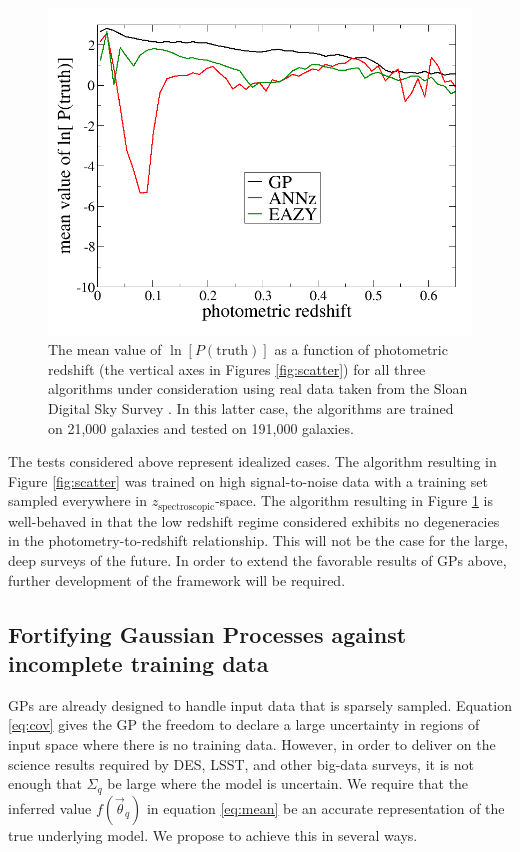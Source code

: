 \documentclass[prd,nofootbib,floatfix,11pt,tightenlines]{revtex4}
\begin{document}
\begin{figure}[th]
\centerline{\includegraphics[scale=0.3]{sdss_lnsum.png}}
\caption{
The mean value of
$\ln[P(\text{truth})]$ as a function of photometric redshift (the vertical
axes in Figures \ref{fig:scatter}) for all
three algorithms under consideration using real
data taken from the Sloan Digital Sky Survey \cite{Abazajian:2008wr}.  
In this latter case, the
algorithms are trained on 21,000 galaxies and tested on 191,000 galaxies.
}
\label{fig:lnsum}
\end{figure}

The tests considered above represent idealized cases.
The algorithm resulting in Figure \ref{fig:scatter} was trained on high
signal-to-noise data with a training set sampled everywhere in
$z_\text{spectroscopic}$-space.  The algorithm resulting in Figure
\ref{fig:lnsum} is well-behaved in that the low redshift regime considered
exhibits no degeneracies in the photometry-to-redshift relationship.  This will
not be the case for the large, deep surveys of the future.  In order to extend
the favorable results of GPs above, further development of the
framework will be required.

\subsection{Fortifying Gaussian Processes against incomplete training data}
\label{sec:sparse}


GPs are already designed to handle input data that is sparsely
sampled.  Equation \ref{eq:cov} gives the GP the freedom to declare a large
uncertainty in regions of input space where there is no training data.  However,
in order to deliver on the science results required by DES, LSST, and other
big-data surveys, it is not enough that $\Sigma_q$ be large where the model is
uncertain.  We require that the inferred 
value $f(\vec{\theta}_q)$ in equation \ref{eq:mean} be an accurate
representation of the true underlying model.  
We propose to achieve this in several ways.
\end{document}
